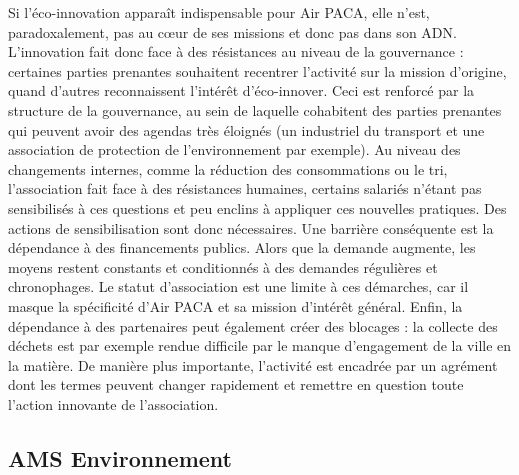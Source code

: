         Si l’éco-innovation apparaît indispensable pour Air PACA, elle n’est, paradoxalement, pas au cœur de ses missions et donc pas dans son ADN. L’innovation fait donc face à des résistances au niveau de la gouvernance : certaines parties prenantes souhaitent recentrer l’activité sur la mission d’origine, quand d’autres reconnaissent l’intérêt d’éco-innover. Ceci est renforcé par la structure de la gouvernance, au sein de laquelle cohabitent des parties prenantes qui peuvent avoir des agendas très éloignés (un industriel du transport et une association de protection de l’environnement par exemple).
        Au niveau des changements internes, comme la réduction des consommations ou le tri, l’association fait face à des résistances humaines, certains salariés n’étant pas sensibilisés à ces questions et peu enclins à appliquer ces nouvelles pratiques. Des actions de sensibilisation sont donc nécessaires.
        Une barrière conséquente est la dépendance à des financements publics. Alors que la demande augmente, les moyens restent constants et conditionnés à des demandes régulières et chronophages. Le statut d’association est une limite à ces démarches, car il masque la spécificité d’Air PACA et sa mission d’intérêt général.
        Enfin, la dépendance à des partenaires peut également créer des blocages : la collecte des déchets est par exemple rendue difficile par le manque d’engagement de la ville en la matière. De manière plus importante, l’activité est encadrée par un agrément dont les termes peuvent changer rapidement et remettre en question toute l’action innovante de l’association.

    \subsection{AMS Environnement}

